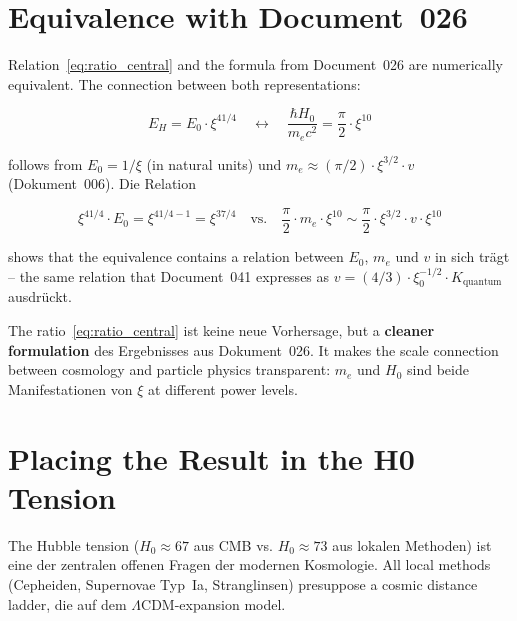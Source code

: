 \section{Equivalence with Document~026}
\label{sec:equivalence}

Relation~\eqref{eq:ratio_central} and the formula from Document~026
are numerically equivalent. The connection between both representations:

\begin{equation}
    E_H = E_0 \cdot \xi^{41/4}
    \quad \longleftrightarrow \quad
    \frac{\hbar H_0}{m_e c^2} = \frac{\pi}{2} \cdot \xi^{10}
\end{equation}

follows from $E_0 = 1/\xi$ (in natural units) und
$m_e \approx (\pi/2) \cdot \xi^{3/2} \cdot v$ (Dokument~006). Die Relation

\begin{equation}
    \xi^{41/4} \cdot E_0 = \xi^{41/4 - 1} = \xi^{37/4}
    \quad \text{vs.} \quad
    \frac{\pi}{2} \cdot m_e \cdot \xi^{10} \sim \frac{\pi}{2} \cdot \xi^{3/2} \cdot v \cdot \xi^{10}
\end{equation}

shows that the equivalence contains a relation between $E_0$, $m_e$ und $v$
in sich trägt -- the same relation that Document~041 expresses as
$v = (4/3) \cdot \xi_0^{-1/2} \cdot K_\text{quantum}$ ausdrückt.

\begin{interpretation}
    The ratio~\eqref{eq:ratio_central} ist keine neue Vorhersage,
    but a \textbf{cleaner formulation} des Ergebnisses aus
    Dokument~026. It makes the scale connection between cosmology
    and particle physics transparent: $m_e$ und $H_0$ sind beide
    Manifestationen von $\xi$ at different power levels.
\end{interpretation}

\section{Placing the Result in the H0 Tension}
\label{sec:hubble}

The Hubble tension ($H_0 \approx 67$ aus CMB vs. $H_0 \approx 73$ aus
lokalen Methoden) ist eine der zentralen offenen Fragen der modernen
Kosmologie. All local methods (Cepheiden, Supernovae Typ~Ia,
Stranglinsen) presuppose a cosmic distance ladder, die
auf dem $\Lambda$CDM-expansion model.

